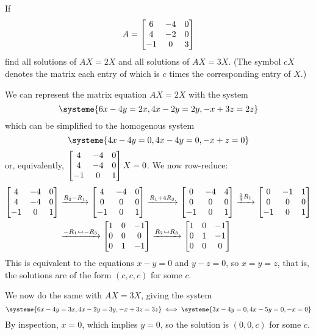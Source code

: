 \begin{xca}
  If \[ A = \begin{bmatrix}6&-4&0 \\ 4&-2&0 \\ -1&0&3\end{bmatrix} \]
  find all solutions of $AX = 2X$ and all solutions of $AX = 3X$.
  (The symbol $cX$ denotes the matrix each entry of which is $c$ times the corresponding entry of $X$.)
\end{xca}
\begin{sol}
  We can represent the matrix equation $AX = 2X$ with the system
  \[ \systeme{6x - 4y = 2x, 4x - 2y = 2y, -x + 3z = 2z} \]
  which can be simplified to the homogenous system
  \[ \systeme{4x - 4y = 0, 4x - 4y = 0, -x + z = 0} \]
  or, equivalently, $\begin{bmatrix}4&-4&0 \\ 4&-4&0 \\ -1&0&1\end{bmatrix}X = 0$. We now row-reduce:
  \begin{equation*}
    \begin{split}
      \begin{bmatrix}4&-4&0 \\ 4&-4&0 \\ -1&0&1\end{bmatrix}
      & \xrightarrow{R_2 - R_1} \begin{bmatrix}4&-4&0 \\ 0&0&0 \\ -1&0&1\end{bmatrix}
      \xrightarrow{R_1 + 4R_3} \begin{bmatrix}0&-4&4 \\ 0&0&0 \\ -1&0&1\end{bmatrix}
      \xrightarrow{\frac14 R_1} \begin{bmatrix}0&-1&1 \\ 0&0&0 \\ -1&0&1\end{bmatrix} \\
      & \xrightarrow{-R_1 \leftrightarrow -R_3} \begin{bmatrix}1&0&-1 \\ 0&0&0 \\ 0&1&-1\end{bmatrix}
      \xrightarrow{R_2 \leftrightarrow R_3} \begin{bmatrix}1&0&-1 \\ 0&1&-1 \\ 0&0&0\end{bmatrix}
    \end{split}
  \end{equation*}
  This is equivalent to the equations $x - y = 0$ and $y - z = 0$, so $x = y = z$, that is,
  the solutions are of the form $(c,c,c)$ for some $c$.

  We now do the same with $AX = 3X$, giving the system
  \[
    \systeme{6x - 4y = 3x, 4x - 2y = 3y, -x + 3z = 3z}
    \iff
    \systeme{3x - 4y = 0, 4x - 5y = 0, -x = 0}
  \]
  By inspection, $x = 0$, which implies $y = 0$, so the solution is $(0,0,c)$ for some $c$.
\end{sol}

